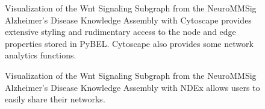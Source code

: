 \begin{figure}
\captionsetup{format=plain}
\caption[PyBEL Visualization of Wnt Signaling in Cytoscape]{Visualization of the Wnt Signaling Subgraph from the \ac{NeuroMMSig} Alzheimer’s Disease Knowledge Assembly with Cytoscape provides extensive styling and rudimentary access to the node and edge properties stored in PyBEL. Cytoscape also provides some network analytics functions.}
\label{Fig:wnt_cytoscape}
\end{figure}

\begin{figure}
\captionsetup{format=plain}
\caption[PyBEL Visualization of Wnt Signaling in NDEx]{Visualization of the Wnt Signaling Subgraph from the \ac{NeuroMMSig} Alzheimer’s Disease Knowledge Assembly with \ac{NDEx} allows users to easily share their networks.}
\label{Fig:wnt_ndex}
\end{figure}

